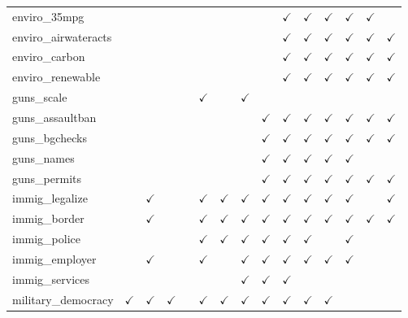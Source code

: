 \documentclass[12pt]{article}
\begin{document}
\begin{table}[H]
{\begin{tabular}{lcccccccccccccl}
enviro\_35mpg &  &  &  &  &  &  &  &  & $\checkmark$ & $\checkmark$ & $\checkmark$ & $\checkmark$ & $\checkmark$ & \\
enviro\_airwateracts &  &  &  &  &  &  &  &  & $\checkmark$ & $\checkmark$ & $\checkmark$ & $\checkmark$ & $\checkmark$ & $\checkmark$\\
enviro\_carbon &  &  &  &  &  &  &  &  & $\checkmark$ & $\checkmark$ & $\checkmark$ & $\checkmark$ & $\checkmark$ & $\checkmark$\\
enviro\_renewable &  &  &  &  &  &  &  &  & $\checkmark$ & $\checkmark$ & $\checkmark$ & $\checkmark$ & $\checkmark$ & $\checkmark$\\
guns\_scale &  &  &  &  & $\checkmark$ &  & $\checkmark$ &  &  &  &  &  &  & \\
guns\_assaultban &  &  &  &  &  &  &  & $\checkmark$ & $\checkmark$ & $\checkmark$ & $\checkmark$ & $\checkmark$ & $\checkmark$ & $\checkmark$\\
guns\_bgchecks &  &  &  &  &  &  &  & $\checkmark$ & $\checkmark$ & $\checkmark$ & $\checkmark$ & $\checkmark$ & $\checkmark$ & $\checkmark$\\
guns\_names &  &  &  &  &  &  &  & $\checkmark$ & $\checkmark$ & $\checkmark$ & $\checkmark$ & $\checkmark$ &  & \\
guns\_permits &  &  &  &  &  &  &  & $\checkmark$ & $\checkmark$ & $\checkmark$ & $\checkmark$ & $\checkmark$ & $\checkmark$ & $\checkmark$\\
immig\_legalize &  & $\checkmark$ &  &  & $\checkmark$ & $\checkmark$ & $\checkmark$ & $\checkmark$ & $\checkmark$ & $\checkmark$ & $\checkmark$ & $\checkmark$ &  & $\checkmark$\\
immig\_border &  & $\checkmark$ &  &  & $\checkmark$ & $\checkmark$ & $\checkmark$ & $\checkmark$ & $\checkmark$ & $\checkmark$ & $\checkmark$ & $\checkmark$ & $\checkmark$ & $\checkmark$\\
immig\_police &  &  &  &  & $\checkmark$ & $\checkmark$ & $\checkmark$ & $\checkmark$ & $\checkmark$ & $\checkmark$ &  & $\checkmark$ &  & \\
immig\_employer &  & $\checkmark$ &  &  & $\checkmark$ &  & $\checkmark$ & $\checkmark$ & $\checkmark$ & $\checkmark$ & $\checkmark$ & $\checkmark$ &  & \\
immig\_services &  &  &  &  &  &  & $\checkmark$ & $\checkmark$ & $\checkmark$ &  &  &  &  & \\
military\_democracy & $\checkmark$ & $\checkmark$ & $\checkmark$ &  & $\checkmark$ & $\checkmark$ & $\checkmark$ & $\checkmark$ & $\checkmark$ & $\checkmark$ & $\checkmark$ &  &  & \\

\end{tabular}}
\end{table}
\end{document}
